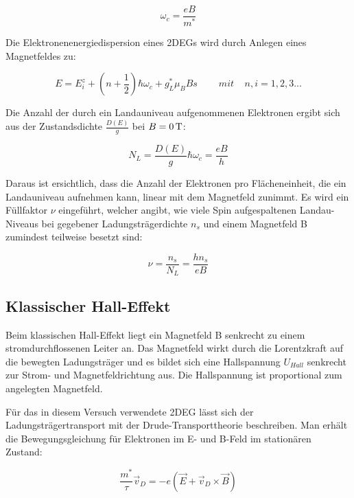 \begin{equation}
\omega_c=\frac{eB}{m^*}
\label{eq:kreisfrequenz}
\end{equation}

Die Elektronenenergiedispersion eines 2DEGs wird durch Anlegen eines Magnetfeldes zu:

\begin{equation}
E=E_i^z +(n+\frac{1}{2})\hbar\omega_c +g_L^*\mu_B Bs ~~~~~~~~~~ mit~~~~~ n,i=1,2,3...
\label{eq:elektr_disp_bfeld}	
\end{equation}

Die Anzahl der durch ein Landauniveau aufgenommenen Elektronen ergibt sich aus der Zustandsdichte $ \frac{D(E)}{g}$ bei $B=\unit
[0]{T}$:

\begin{equation}
N_L=\frac{D(E)}{g}\hbar\omega_c = \frac{eB}{h}
\label{eq:zustandsd_pro_landauniveau}
\end{equation}

Daraus ist ersichtlich, dass die Anzahl der Elektronen pro Flächeneinheit, die ein Landauniveau aufnehmen kann, linear mit dem Magnetfeld zunimmt. Es wird ein Füllfaktor $\nu$ eingeführt, welcher angibt, wie viele Spin aufgespaltenen Landau-Niveaus bei gegebener Ladungsträgerdichte $n_s$ und einem Magnetfeld B zumindest teilweise besetzt sind:

\begin{equation}
\nu=\frac{n_s}{N_L}=\frac{hn_s}{eB}
\label{eq:einfuehrung_fuellfakt}
\end{equation}


\subsection{Klassischer Hall-Effekt}

Beim klassischen Hall-Effekt liegt ein Magnetfeld B senkrecht zu einem stromdurchflossenen Leiter an. Das Magnetfeld wirkt durch die Lorentzkraft auf die bewegten Ladungsträger und es bildet sich eine Hallspannung $U_{Hall}$ senkrecht zur Strom- und Magnetfeldrichtung aus. Die Hallspannung ist proportional zum angelegten Magnetfeld.


Für das in diesem Versuch verwendete 2DEG lässt sich der Ladungsträgertransport mit der Drude-Transporttheorie beschreiben. 
Man erhält die Bewegungsgleichung für Elektronen im E- und B-Feld im stationären Zustand:

\begin{equation}
\frac{m^*}{\tau} \vec{v}_D = -e(\vec{E}+\vec{v}_D \times \vec{B})
\label{eq:beweggl_stat}
\end{equation}

